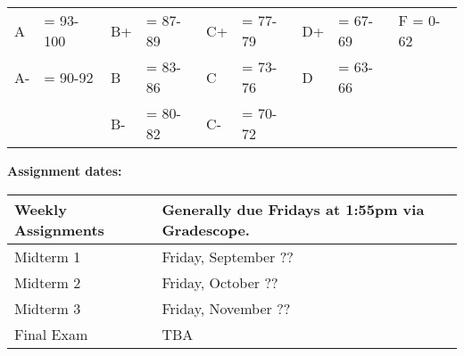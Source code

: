 \documentclass[12pt]{article}
\begin{document}
\begin{center}
  \begin{tabular}{|ll|ll|ll|ll|l|}
\hline
A  &\hspace{-3 pt}\hspace{-7 pt}= 93-100   &B+ &\hspace{-7 pt}= 87-89  &C+ &\hspace{-7 pt}= 77-79 & D+ &\hspace{-7 pt}= 67-69  & F = 0-62\\
A- &\hspace{-3 pt}\hspace{-7 pt}= 90-92    &B  &\hspace{-7 pt}= 83-86  & C &\hspace{-7 pt}= 73-76  & D  &\hspace{-7 pt}= 63-66 &\\
   &                         &B- &\hspace{-7 pt}= 80-82  &C- &\hspace{-7 pt}= 70-72 &    &        &\\
    \hline
  \end{tabular}
\end{center}






\noindent\textbf{Assignment dates:}

\begin{center}
  \begin{tabular}{|l|l|}
    \hline
    Weekly Assignments & Generally due Fridays at 1:55pm via Gradescope.\\
    \hline
    Midterm 1  & Friday, September ?? \\
    Midterm 2  & Friday, October ?? \\
    Midterm 3  & Friday, November ?? \\             
    Final Exam  & TBA	 \\
    \hline
  \end{tabular}
\end{center}
\end{document}
